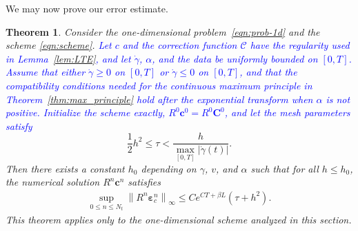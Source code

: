\documentclass[11pt,reqno]{amsart}
\theoremstyle{plain}
\newtheorem{theorem}{Theorem}[section]
\theoremstyle{definition}
\numberwithin{equation}{section}
\newcommand{\paren}[1]{\left(#1\right)}
\newcommand{\bm}[1]{\boldsymbol{#1}}
\newcommand{\abs}[1]{\left\lvert #1 \right\rvert}
\newcommand{\norm}[1]{\left\lVert #1 \right\rVert}
\newcommand{\Corr}{\mathcal C}
\begin{document}
We may now prove our error estimate.

\begin{theorem}\label{thm:err-est-o2}
Consider the one-dimensional problem~\eqref{eqn:prob-1d} and the scheme
\eqref{eqn:scheme}. \textcolor{blue}{Let $c$ and the correction function
$\Corr$ have the regularity used in Lemma}~\ref{lem:LTE}\textcolor{blue}{,
and let $\dot\gamma$, $\alpha$, and the data be uniformly bounded on
$[0,T]$. Assume that either $\dot\gamma\ge 0$ on $[0,T]$ or
$\dot\gamma\le 0$ on $[0,T]$, and that the compatibility conditions needed
for the continuous maximum principle in Theorem~\ref{thm:max_principle} hold after
the exponential transform when $\alpha$ is not positive. Initialize the scheme
exactly, $R^0\bm c^0=R^0\bm C^0$, and let the mesh parameters satisfy}
\begin{equation}
    \frac{1}{2}h^2 \le \tau < \frac{h}{\max_{[0,T]}\abs{\dot{\gamma}(t)}} .
\end{equation}
Then there exists a constant $h_0$ depending on $\gamma$, $v$, and $\alpha$
such that for all $h\le h_0$, the numerical solution
$R^n\bm c^n$ satisfies
\begin{equation}\label{eqn:err-est-o2}
\begin{aligned}
    \sup_{0\le n\le N_t}\norm{R^n\bm\varepsilon_c^n}_\infty  \le  C e^{CT+\beta L} \paren{\tau +h^2}.
\end{aligned}
\end{equation}
This theorem applies only to the one-dimensional scheme analyzed in this section.
\end{theorem}
\end{document}
